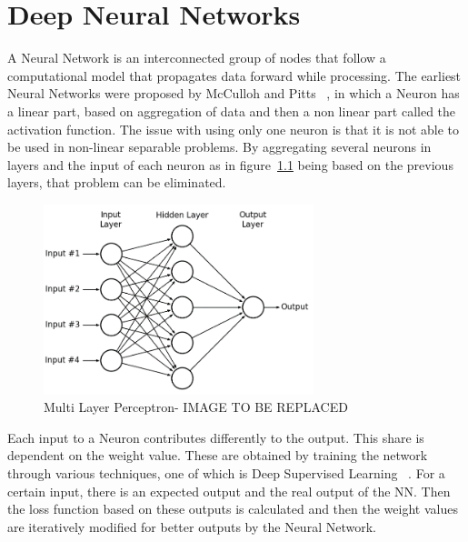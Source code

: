 \chapter{Deep Neural Networks}
\label{chapter:cnn}



\quad A Neural Network is an interconnected group of nodes that follow a computational model that propagates data forward while processing. 
The earliest Neural Networks were proposed by McCulloh and Pitts~\cite{neuron:model}
, in which a Neuron has a linear part, based on aggregation of data and then a non linear part called the activation function. The issue with using only one neuron
is that it is not able to be used in non-linear separable problems.
By aggregating several neurons in layers and the input of each neuron as in figure~\ref{MLP}
being based on the previous layers, that problem can be eliminated.

\begin{figure}[!htbp]
    \centering
    \includegraphics[width=0.7\textwidth]{Figures/mlp-tobereplaced.png}
    \caption{Multi Layer Perceptron- IMAGE TO BE REPLACED}
    \label{MLP}
\end{figure} 


 Each input to a Neuron contributes differently to the output. This share is dependent on the weight value. 
 These are obtained by training the network through various techniques, one of which is Deep Supervised
 Learning~\cite{deeplearning}
 . For a certain input, there is an expected output and the real output of the NN. Then the loss function based on these outputs
 is calculated and then the weight values are iteratively modified for better outputs by the Neural Network.




